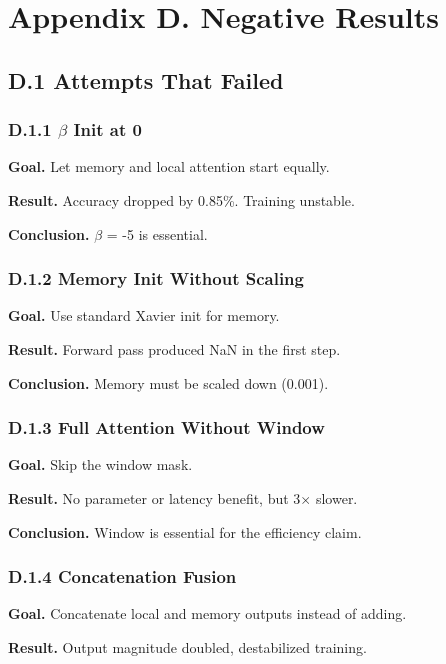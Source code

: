 
\section{Appendix D. Negative Results}

\subsection{D.1 Attempts That Failed}

\subsubsection{D.1.1 $\beta$ Init at 0}

\textbf{Goal.} Let memory and local attention start equally.

\textbf{Result.} Accuracy dropped by 0.85\%. Training unstable.

\textbf{Conclusion.} $\beta$ = -5 is essential.

\subsubsection{D.1.2 Memory Init Without Scaling}

\textbf{Goal.} Use standard Xavier init for memory.

\textbf{Result.} Forward pass produced NaN in the first step.

\textbf{Conclusion.} Memory must be scaled down (0.001).

\subsubsection{D.1.3 Full Attention Without Window}

\textbf{Goal.} Skip the window mask.

\textbf{Result.} No parameter or latency benefit, but 3$\times$ slower.

\textbf{Conclusion.} Window is essential for the efficiency claim.

\subsubsection{D.1.4 Concatenation Fusion}

\textbf{Goal.} Concatenate local and memory outputs instead of adding.

\textbf{Result.} Output magnitude doubled, destabilized training.

